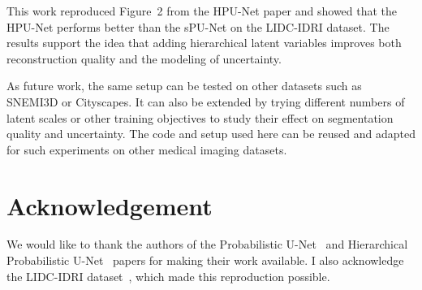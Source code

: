 \documentclass{article}
\begin{document}
This work reproduced Figure~2 from the HPU-Net paper and showed that the 
HPU-Net performs better than the sPU-Net on the LIDC-IDRI dataset. The results 
support the idea that adding hierarchical latent variables improves both 
reconstruction quality and the modeling of uncertainty. 



As future work, the same setup can be tested on other datasets such as SNEMI3D 
or Cityscapes. It can also be extended by trying different numbers of latent 
scales or other training objectives to study their effect on segmentation 
quality and uncertainty. The code and setup used here can be reused and adapted 
for such experiments on other medical imaging datasets.


\section{Acknowledgement}
We would like to thank the authors of the Probabilistic U-Net~\cite{Kohl2018} and Hierarchical Probabilistic U-Net~\cite{Kohl2019} papers for making their work available. I also acknowledge the LIDC-IDRI dataset~\cite{Armato2011,Clark2013}, which made this reproduction possible.
\end{document}
